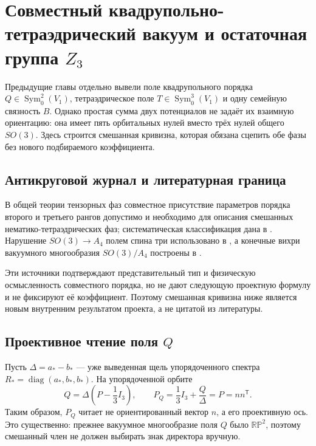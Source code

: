 \chapter{Совместный квадрупольно-тетраэдрический вакуум и остаточная группа
\texorpdfstring{$Z_3$}{Z3}}

Предыдущие главы отдельно вывели поле квадрупольного порядка
$Q\in\operatorname{Sym}_0^2(V_1)$, тетраэдрическое поле
$T\in\operatorname{Sym}_0^3(V_1)$ и одну семейную связность $B$. Однако
простая сумма двух потенциалов не задаёт их взаимную ориентацию: она имеет
пять орбитальных нулей вместо трёх нулей общего $SO(3)$. Здесь строится
смешанная кривизна, которая обязана сцепить обе фазы без нового
подбираемого коэффициента.

\section{Антикруговой журнал и литературная граница}

В общей теории тензорных фаз совместное присутствие параметров порядка
второго и третьего рангов допустимо и необходимо для описания смешанных
нематико-тетраэдрических фаз; систематическая классификация дана в
. Нарушение $SO(3)\to A_4$ полем спина три
использовано в , а конечные вихри вакуумного
многообразия $SO(3)/A_4$ построены в .

Эти источники подтверждают представительный тип и физическую осмысленность
совместного порядка, но не дают следующую проектную формулу и не фиксируют
её коэффициент. Поэтому смешанная кривизна ниже является новым внутренним
результатом проекта, а не цитатой из литературы.

\section{Проективное чтение поля \texorpdfstring{$Q$}{Q}}

Пусть $\Delta=a_*-b_*$ --- уже выведенная щель упорядоченного спектра
$R_*=\operatorname{diag}(a_*,b_*,b_*)$. На упорядоченной орбите
\begin{equation}
 Q=\Delta\left(P-\frac13I_3\right),
 \qquad
 P_Q=\frac13I_3+\frac{Q}{\Delta}=P=nn^{\mathsf T}.
 \label{eq:v6-coupled-projective-readout}
\end{equation}
Таким образом, $P_Q$ читает не ориентированный вектор $n$, а его
проективную ось. Это существенно: прежнее вакуумное многообразие поля
$Q$ было $\mathbb{RP}^2$, поэтому смешанный член не должен выбирать знак
директора вручную.

